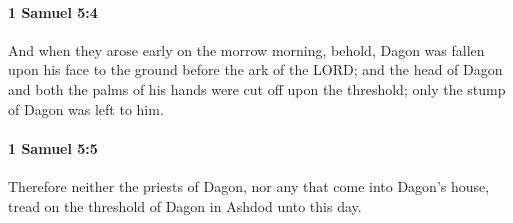 		\paragraph{1 Samuel 5:4} %
			\label{1SAMUEL-5-4}

			And when they arose early on the morrow morning, behold, Dagon was fallen upon his face to the ground before the ark of the LORD; and the head of Dagon and both the palms of his hands were cut off upon the threshold; only the stump of Dagon was left to him.


		\paragraph{1 Samuel 5:5} %
			\label{1SAMUEL-5-5}

			Therefore neither the priests of Dagon, nor any that come into Dagon’s house, tread on the threshold of Dagon in Ashdod unto this day.

